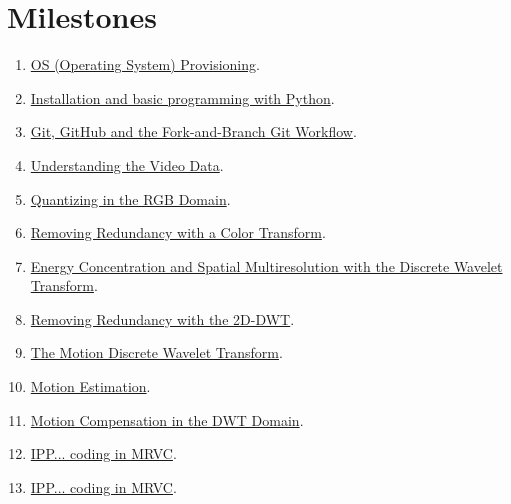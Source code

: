 \section{Milestones}
\begin{enumerate}
\item \href{https://sistemas-multimedia.github.io/study_guide/01-provisioning/}{OS (Operating System) Provisioning}.
\item \href{https://sistemas-multimedia.github.io/study_guide/02-python/}{Installation and basic programming with Python}.
\item \href{https://sistemas-multimedia.github.io/study_guide/03-git/}{Git, GitHub and the Fork-and-Branch Git Workflow}.
\item \href{https://sistemas-multimedia.github.io/study_guide/04-the_data/}{Understanding the Video Data}.
\item \href{https://sistemas-multimedia.github.io/study_guide/05-quantization/}{Quantizing in the RGB Domain}.
\item \href{https://sistemas-multimedia.github.io/study_guide/06-color_transform/}{Removing Redundancy with a Color Transform}.
\item \href{https://sistemas-multimedia.github.io/study_guide/07-DWT/}{Energy Concentration and Spatial Multiresolution with the Discrete Wavelet Transform}.
\item \href{https://sistemas-multimedia.github.io/study_guide/08-2D-DWT/}{Removing Redundancy with the 2D-DWT}.
\item \href{https://sistemas-multimedia.github.io/study_guide/09-MDWT/}{The Motion Discrete Wavelet Transform}.
\item \href{https://sistemas-multimedia.github.io/study_guide/10-ME/}{Motion Estimation}.
\item \href{https://sistemas-multimedia.github.io/study_guide/11-MC_in_DWT_domain/}{Motion Compensation in the DWT Domain}.
\item \href{https://sistemas-multimedia.github.io/study_guide/12-IPP_coding/}{IPP... coding in MRVC}.
\item \href{file://12-IPP_coding/}{IPP... coding in MRVC}.
\end{enumerate}

